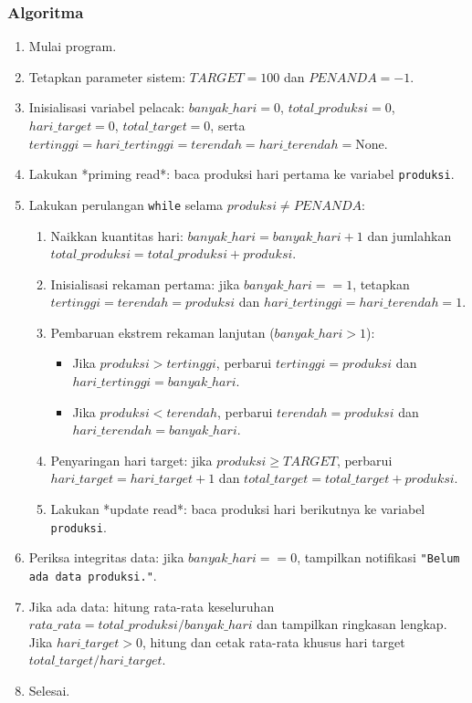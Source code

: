 \documentclass[12pt,a4paper]{article}
\begin{document}
\subsubsection{Algoritma}
\begin{enumerate}
    \item Mulai program.
    \item Tetapkan parameter sistem: $TARGET = 100$ dan $PENANDA = -1$.
    \item Inisialisasi variabel pelacak: $banyak\_hari = 0$, $total\_produksi = 0$, $hari\_target = 0$, $total\_target = 0$, serta $tertinggi = hari\_tertinggi = terendah = hari\_terendah = \text{None}$.
    \item Lakukan *priming read*: baca produksi hari pertama ke variabel \texttt{produksi}.
    \item Lakukan perulangan \texttt{while} selama $produksi \ne PENANDA$:
    \begin{enumerate}[label=\alph*.]
        \item Naikkan kuantitas hari: $banyak\_hari = banyak\_hari + 1$ dan jumlahkan $total\_produksi = total\_produksi + produksi$.
        \item Inisialisasi rekaman pertama: jika $banyak\_hari == 1$, tetapkan $tertinggi = terendah = produksi$ dan $hari\_tertinggi = hari\_terendah = 1$.
        \item Pembaruan ekstrem rekaman lanjutan ($banyak\_hari > 1$):
        \begin{itemize}
            \item Jika $produksi > tertinggi$, perbarui $tertinggi = produksi$ dan $hari\_tertinggi = banyak\_hari$.
            \item Jika $produksi < terendah$, perbarui $terendah = produksi$ dan $hari\_terendah = banyak\_hari$.
        \end{itemize}
        \item Penyaringan hari target: jika $produksi \ge TARGET$, perbarui $hari\_target = hari\_target + 1$ dan $total\_target = total\_target + produksi$.
        \item Lakukan *update read*: baca produksi hari berikutnya ke variabel \texttt{produksi}.
    \end{enumerate}
    \item Periksa integritas data: jika $banyak\_hari == 0$, tampilkan notifikasi \texttt{"Belum ada data produksi."}.
    \item Jika ada data: hitung rata-rata keseluruhan $rata\_rata = total\_produksi / banyak\_hari$ dan tampilkan ringkasan lengkap. Jika $hari\_target > 0$, hitung dan cetak rata-rata khusus hari target $total\_target / hari\_target$.
    \item Selesai.
\end{enumerate}
\end{document}
